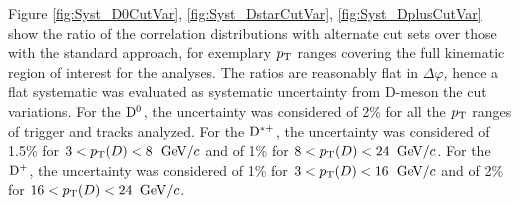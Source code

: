 Figure \ref{fig:Syst_D0CutVar}, \ref{fig:Syst_DstarCutVar}, \ref{fig:Syst_DplusCutVar} show the ratio of the correlation distributions with alternate cut sets over those with the standard approach, for exemplary $p_{\rm T}$ ranges covering the full kinematic region of interest for the analyses. The ratios are reasonably flat in $\Delta\varphi$, hence a flat systematic was evaluated as systematic uncertainty from D-meson the cut variations. For the ${\rm D^0}$, the uncertainty was considered of 2\% for all the $p_{\rm T}$ ranges of trigger and tracks analyzed. For the ${\rm D^{*+}}$, the uncertainty was considered of 1.5\% for $3 < p_{\rm T}(D) < 8$ $\mathrm{GeV}/c$ and of 1\% for $8 < p_{\rm T}(D) < 24$ $\mathrm{GeV}/c$. For the ${\rm D^+}$, the uncertainty was considered of 1\% for $3 < p_{\rm T}(D) < 16$ $\mathrm{GeV}/c$ and of 2\% for $16 < p_{\rm T}(D) < 24$ $\mathrm{GeV}/c$.

